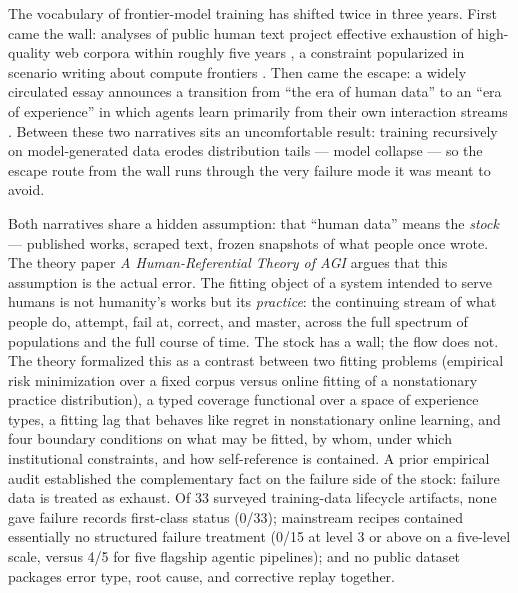 \documentclass[10pt]{article}
\begin{document}
The vocabulary of frontier-model training has shifted twice in three years. First came the wall: analyses of public human text project effective exhaustion of high-quality web corpora within roughly five years \cite{ref1}, a constraint popularized in scenario writing about compute frontiers \cite{ref2}. Then came the escape: a widely circulated essay announces a transition from ``the era of human data'' to an ``era of experience'' in which agents learn primarily from their own interaction streams \cite{ref3}. Between these two narratives sits an uncomfortable result: training recursively on model-generated data erodes distribution tails --- model collapse \cite{ref4} --- so the escape route from the wall runs through the very failure mode it was meant to avoid.

Both narratives share a hidden assumption: that ``human data'' means the \emph{stock} --- published works, scraped text, frozen snapshots of what people once wrote. The theory paper \emph{A Human-Referential Theory of AGI} \cite{ref5} argues that this assumption is the actual error. The fitting object of a system intended to serve humans is not humanity's works but its \emph{practice}: the continuing stream of what people do, attempt, fail at, correct, and master, across the full spectrum of populations and the full course of time. The stock has a wall; the flow does not. The theory formalized this as a contrast between two fitting problems (empirical risk minimization over a fixed corpus versus online fitting of a nonstationary practice distribution), a typed coverage functional over a space of experience types, a fitting lag that behaves like regret in nonstationary online learning, and four boundary conditions on what may be fitted, by whom, under which institutional constraints, and how self-reference is contained. A prior empirical audit \cite{ref6} established the complementary fact on the failure side of the stock: failure data is treated as exhaust. Of 33 surveyed training-data lifecycle artifacts, none gave failure records first-class status (0/33); mainstream recipes contained essentially no structured failure treatment (0/15 at level 3 or above on a five-level scale, versus 4/5 for five flagship agentic pipelines); and no public dataset packages error type, root cause, and corrective replay together.
\end{document}
